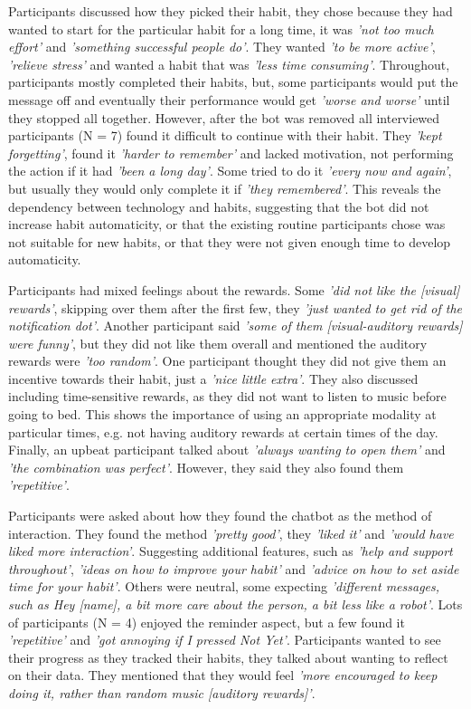 Participants discussed how they picked their habit, they chose because they had wanted to start for the particular habit for a long time, it was \textit{'not too much effort'} and \textit{'something successful people do'}. They wanted \textit{'to be more active'}, \textit{'relieve stress'} and wanted a habit that was \textit{'less time consuming'}. Throughout, participants mostly completed their habits, but, some participants would put the message off and eventually their performance would get \textit{'worse and worse'} until they stopped all together. However, after the bot was removed all interviewed participants (N = 7) found it difficult to continue with their habit. They \textit{'kept forgetting'}, found it \textit{'harder to remember'} and lacked motivation, not performing the action if it had \textit{'been a long day'}. Some tried to do it \textit{'every now and again'}, but usually they would only complete it if \textit{'they remembered'}. This reveals the dependency between technology and habits, suggesting that the bot did not increase habit automaticity, or that the existing routine participants chose was not suitable for new habits, or that they were not given enough time to develop automaticity.

Participants had mixed feelings about the rewards. Some \textit{'did not like the [visual] rewards'}, skipping over them after the first few, they \textit{'just wanted to get rid of the notification dot'}. Another participant said \textit{'some of them [visual-auditory rewards] were funny'}, but they did not like them overall and mentioned the auditory rewards were \textit{'too random'}. One participant thought they did not give them an incentive towards their habit, just a \textit{'nice little extra'}. They also discussed including time-sensitive rewards, as they did not want to listen to music before going to bed. This shows the importance of using an appropriate modality at particular times, e.g. not having auditory rewards at certain times of the day. Finally, an upbeat participant talked about \textit{'always wanting to open them'} and \textit{'the combination was perfect'}. However, they said they also found them \textit{'repetitive'}.


Participants were asked about how they found the chatbot as the method of interaction. They found the method \textit{'pretty good'}, they \textit{'liked it'} and \textit{'would have liked more interaction'}. Suggesting additional features, such as \textit{'help and support throughout'}, \textit{'ideas on how to improve your habit'} and \textit{'advice on how to set aside time for your habit'}. Others were neutral, some expecting \textit{'different messages, such as Hey [name], a bit more care about the person, a bit less like a robot'}. Lots of participants (N = 4) enjoyed the reminder aspect, but a few found it \textit{'repetitive'} and \textit{'got annoying if I pressed Not Yet'}. Participants wanted to see their progress as they tracked their habits, they talked about wanting to reflect on their data. They mentioned that they would feel \textit{'more encouraged to keep doing it, rather than random music [auditory rewards]'}.


